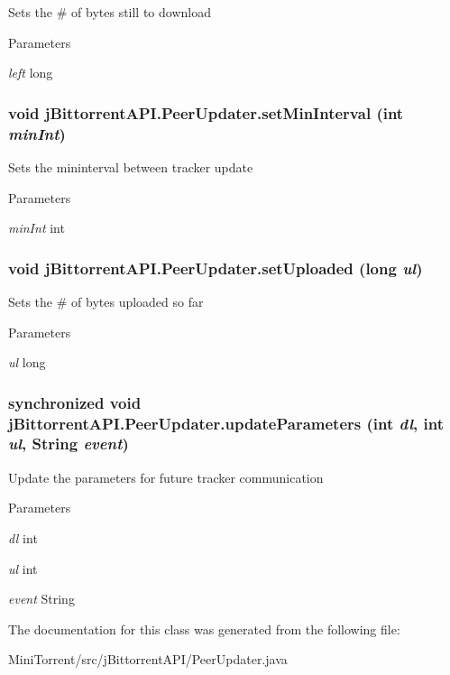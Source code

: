 Sets the \# of bytes still to download 
\begin{DoxyParams}{Parameters}
\item[{\em left}]long \end{DoxyParams}
\hypertarget{classj_bittorrent_a_p_i_1_1_peer_updater_a05728663a20a93596f60f4c1ce00464b}{
\subsubsection[{setMinInterval}]{\setlength{\rightskip}{0pt plus 5cm}void jBittorrentAPI.PeerUpdater.setMinInterval (int {\em minInt})}}
\label{classj_bittorrent_a_p_i_1_1_peer_updater_a05728663a20a93596f60f4c1ce00464b}
Sets the mininterval between tracker update 
\begin{DoxyParams}{Parameters}
\item[{\em minInt}]int \end{DoxyParams}
\hypertarget{classj_bittorrent_a_p_i_1_1_peer_updater_abdc2d078d4cc82cfe54fa438d14d2f7a}{
\subsubsection[{setUploaded}]{\setlength{\rightskip}{0pt plus 5cm}void jBittorrentAPI.PeerUpdater.setUploaded (long {\em ul})}}
\label{classj_bittorrent_a_p_i_1_1_peer_updater_abdc2d078d4cc82cfe54fa438d14d2f7a}
Sets the \# of bytes uploaded so far 
\begin{DoxyParams}{Parameters}
\item[{\em ul}]long \end{DoxyParams}
\hypertarget{classj_bittorrent_a_p_i_1_1_peer_updater_aa00f371b8c47900ba8b9ab6ed048a2b3}{
\subsubsection[{updateParameters}]{\setlength{\rightskip}{0pt plus 5cm}synchronized void jBittorrentAPI.PeerUpdater.updateParameters (int {\em dl}, \/  int {\em ul}, \/  String {\em event})}}
\label{classj_bittorrent_a_p_i_1_1_peer_updater_aa00f371b8c47900ba8b9ab6ed048a2b3}
Update the parameters for future tracker communication 
\begin{DoxyParams}{Parameters}
\item[{\em dl}]int \item[{\em ul}]int \item[{\em event}]String \end{DoxyParams}


The documentation for this class was generated from the following file:\begin{DoxyCompactItemize}
\item 
MiniTorrent/src/jBittorrentAPI/PeerUpdater.java\end{DoxyCompactItemize}
